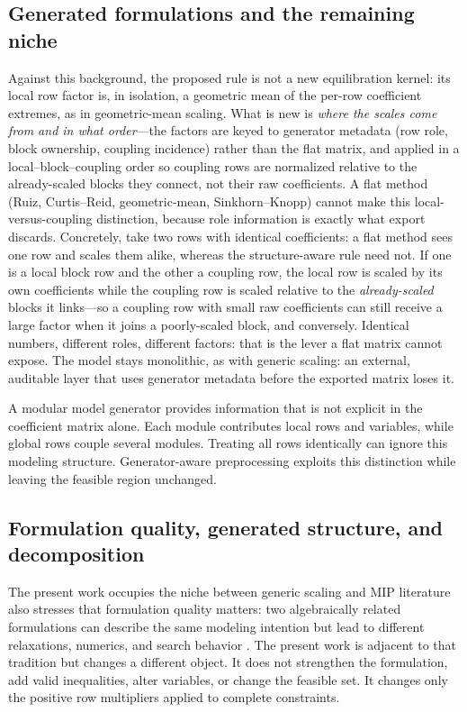 \documentclass[AMA,Times1COL]{WileyNJDv5} %
\providecommand{\DIFadd}[1]{{\protect\color{blue} \sf #1}} %
\providecommand{\DIFdel}[1]{{\protect\color{red} \scriptsize #1}} %
\providecommand{\DIFaddbegin}{} %
\providecommand{\DIFaddend}{} %
\providecommand{\DIFdelbegin}{} %
\providecommand{\DIFdelend}{} %
\begin{document}
\DIFdelbegin \subsection{\DIFdel{Generated formulations and the remaining niche}}
\addtocounter{subsection}{-1}%
\DIFdelend \DIFaddbegin \DIFadd{Against this background, the proposed rule is not a new equilibration kernel: its local row
factor is, in isolation, a geometric mean of the per-row coefficient extremes, as in
geometric-mean scaling. What is new is \emph{where the scales come from and in what order}---the
factors are keyed to generator metadata (row role, block ownership, coupling incidence) rather
than the flat matrix, and applied in a local--block--coupling order so coupling rows are
normalized relative to the already-scaled blocks they connect, not their raw coefficients. A flat
method (Ruiz, Curtis--Reid, geometric-mean, Sinkhorn--Knopp) cannot make this
local-versus-coupling distinction, because role information is exactly what export discards. Concretely, take two rows with
identical coefficients: a flat method sees one row and scales them alike, whereas the
structure-aware rule need not. If one is a local block row and the other a coupling row, the
local row is scaled by its own coefficients while the coupling row is scaled relative to the
\emph{already-scaled} blocks it links---so a coupling row with small raw coefficients can still
receive a large factor when it joins a poorly-scaled block, and conversely. Identical numbers,
different roles, different factors: that is the lever a flat matrix cannot expose. The
model stays monolithic, as with generic scaling: an external, auditable layer that uses
generator metadata before the exported matrix loses it.
}\DIFaddend 

\DIFdelbegin \DIFdel{A modular model generator provides information that is not explicit in the coefficient
matrix alone. Each module contributes local rows and variables, while global rows couple
several modules. Treating all rows identically can ignore this modeling structure. Generator-aware preprocessing exploits this distinction while leaving the feasible region
unchanged. }\DIFdelend \DIFaddbegin \subsection{\DIFadd{Formulation quality, generated structure, and decomposition}}
\DIFaddend 

The \DIFdelbegin \DIFdel{present work occupies the niche between generic scaling and }\DIFdelend \DIFaddbegin \DIFadd{MIP literature also stresses that formulation quality matters: two algebraically
related formulations can describe the same modeling intention but lead to different
relaxations, numerics, and search behavior \cite{vielma2015formulation}. The present
work is adjacent to that tradition but changes a different object. It does not strengthen
the formulation, add valid inequalities, alter variables, or change the feasible set. It
changes only the positive row multipliers applied to complete constraints.
}
\end{document}
